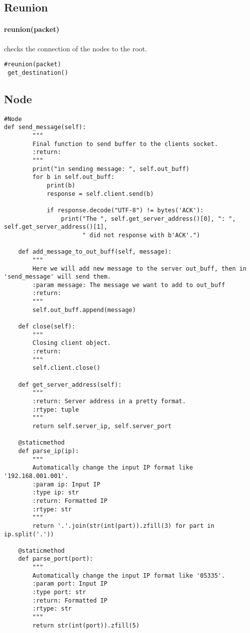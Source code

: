 \documentclass{article}
\begin{document}
\subsection{Reunion}
\paragraph{reunion(packet)} checks the connection of the nodes to the root.
\begin{lstlisting}
#reunion(packet)
 get_destination()
\end{lstlisting}
\subsection{Node}
\begin{lstlisting}
#Node
def send_message(self):
        """
        Final function to send buffer to the clients socket.
        :return:
        """
        print("in sending message: ", self.out_buff)
        for b in self.out_buff:
            print(b)
            response = self.client.send(b)

            if response.decode("UTF-8") != bytes('ACK'):
                print("The ", self.get_server_address()[0], ": ", self.get_server_address()[1],
                      " did not response with b'ACK'.")

    def add_message_to_out_buff(self, message):
        """
        Here we will add new message to the server out_buff, then in 'send_message' will send them.
        :param message: The message we want to add to out_buff
        :return:
        """
        self.out_buff.append(message)

    def close(self):
        """
        Closing client object.
        :return:
        """
        self.client.close()

    def get_server_address(self):
        """
        :return: Server address in a pretty format.
        :rtype: tuple
        """
        return self.server_ip, self.server_port

    @staticmethod
    def parse_ip(ip):
        """
        Automatically change the input IP format like '192.168.001.001'.
        :param ip: Input IP
        :type ip: str
        :return: Formatted IP
        :rtype: str
        """
        return '.'.join(str(int(part)).zfill(3) for part in ip.split('.'))

    @staticmethod
    def parse_port(port):
        """
        Automatically change the input IP format like '05335'.
        :param port: Input IP
        :type port: str
        :return: Formatted IP
        :rtype: str
        """
        return str(int(port)).zfill(5)
\end{lstlisting}
\end{document}
